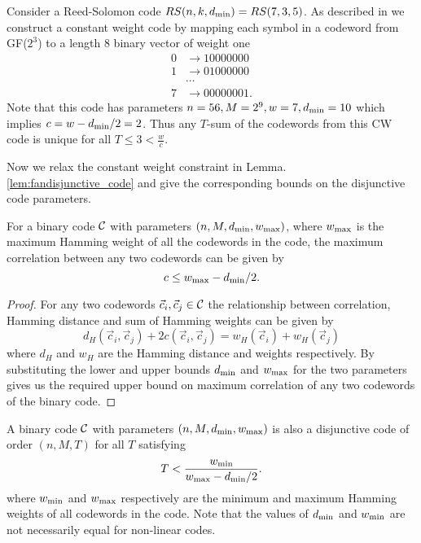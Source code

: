 \begin{example}
Consider a Reed-Solomon code $RS(n,k,d_{\mathrm{min}})=RS(7,3,5)$. As described in \cite{fan1995superimposed} we construct a constant weight code by mapping each symbol in a codeword from GF($2^3$) to a length $8$ binary vector of weight one
\begin{align*}
0&\rightarrow 10000000\\
1&\rightarrow 01000000\\
&\cdots	\\
7&\rightarrow 00000001.
\end{align*}
Note that this code has parameters $n=56,M=2^9, w=7,d_{\mathrm{min}}=10$ which implies $c=w-d_{\mathrm{min}}/2=2$. Thus any $T$-sum of the codewords from this CW code is unique for all $T\leq 3<\frac{w}{c}$.
\end{example}

Now we relax the constant weight constraint in Lemma. \ref{lem:fandisjunctive_code} and give the corresponding bounds on the disjunctive code parameters.

\begin{lemma}
\label{lem:maxCorr_nonconstwtcode}
For a binary code $\mathcal{C}$ with parameters $(n,M,d_{\mathrm{min}},w_{\text{max}})$, where $w_{\text{max}}$ is the maximum Hamming weight of all the codewords in the code, the maximum correlation between any two codewords can be given by
\[
c\leq w_{\text{max}}-d_{\mathrm{min}}/2.
\]
\end{lemma}
\begin{proof}
For any two codewords $\vec{c}_i, \vec{c}_j\in\mathcal{C}$ the relationship between correlation, Hamming distance and sum of Hamming weights can be given by
\[
d_H(\vec{c}_i,\vec{c}_j)+2c(\vec{c}_i,\vec{c}_j)=w_H(\vec{c}_i)+w_H(\vec{c}_j)
\]
where $d_H$ and $w_H$ are the Hamming distance and weights respectively. By substituting the lower and upper bounds $d_{\mathrm{min}}$ and $w_{\text{max}}$ for the two parameters gives us the required upper bound on maximum correlation of any two codewords of the binary code.
\end{proof}

\begin{lemma}
A binary code $\mathcal{C}$ with parameters $(n,M,d_{\mathrm{min}},w_{\text{max}})$ is also a disjunctive code of order $(n,M,T)$ for all $T$ satisfying
\begin{align}
T<\frac{w_{\text{min}}}{w_{\text{max}}-d_{\mathrm{min}}/2}.
\label{eqn:mac_CS_mainbound}
\end{align}
where $w_{\text{min}}$ and $w_{\text{max}}$ respectively are the minimum and maximum Hamming weights of all codewords in the code. Note that the values of $d_{\mathrm{min}}$ and $w_{\text{min}}$ are not necessarily equal for non-linear codes.
\label{lem:mac_CS_mainbound}
\end{lemma}

